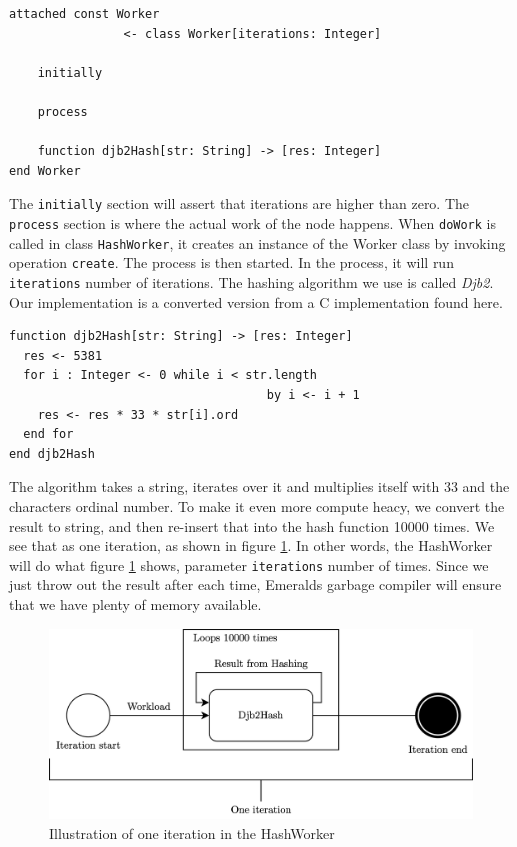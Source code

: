 \begin{minipage}{\linewidth}
\begin{lstlisting}[language=emerald]
attached const Worker 
                <- class Worker[iterations: Integer]
                
    initially
    
    process
    
    function djb2Hash[str: String] -> [res: Integer]
end Worker
\end{lstlisting}
\end{minipage}
The \verb|initially| section will assert that iterations are higher than zero. The \verb|process| section is where the actual work of the node happens. When \verb|doWork| is called in class \verb|HashWorker|, it creates an instance of the Worker class by invoking operation \verb|create|. The process is then started. In the process, it will run \verb|iterations| number of iterations. The hashing algorithm we use is called \textit{Djb2}. Our implementation is a converted version from a C implementation found here\cite{noauthor_hash_nodate}.
\begin{lstlisting}[language=emerald]
function djb2Hash[str: String] -> [res: Integer]
  res <- 5381
  for i : Integer <- 0 while i < str.length 
                                    by i <- i + 1
    res <- res * 33 * str[i].ord
  end for
end djb2Hash
\end{lstlisting}
The algorithm takes a string, iterates over it and multiplies itself with 33 and the characters ordinal number. To make it even more compute heacy, we convert the result to string, and then re-insert that into the hash function 10000 times. We see that as one iteration, as shown in figure \ref{fig:Hashing_algorithm_iteration}. In other words, the HashWorker will do what figure \ref{fig:Hashing_algorithm_iteration} shows, parameter \verb|iterations| number of times. Since we just throw out the result after each time, Emeralds garbage compiler will ensure that we have plenty of memory available. 
\begin{figure}[t]
    \centering
    \includegraphics[scale=0.9]{chapters/implementation/figures/Iteration.png}
    \caption{Illustration of one iteration in the HashWorker}
    \label{fig:Hashing_algorithm_iteration}
\end{figure}




